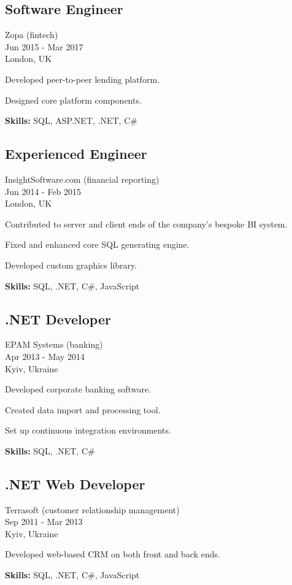 \documentclass[a4paper,10pt]{article}
\begin{document}
\subsection*{Software Engineer}
Zopa (fintech) \\
Jun 2015 - Mar 2017 \\
London, UK
\begin{bulletlist}
    \item Developed peer-to-peer lending platform.
    \item Designed core platform components.
\end{bulletlist}
\textbf{Skills:} SQL, ASP.NET, .NET, C\#

\subsection*{Experienced Engineer}
InsightSoftware.com (financial reporting) \\
Jun 2014 - Feb 2015 \\
London, UK
\begin{bulletlist}
    \item Contributed to server and client ends of the company's bespoke BI system.
    \item Fixed and enhanced core SQL generating engine.
    \item Developed custom graphics library.
\end{bulletlist}
\textbf{Skills:} SQL, .NET, C\#, JavaScript

\subsection*{.NET Developer}
EPAM Systems (banking) \\
Apr 2013 - May 2014 \\
Kyiv, Ukraine
\begin{bulletlist}
    \item Developed corporate banking software.
    \item Created data import and processing tool.
    \item Set up continuous integration environments.
\end{bulletlist}
\textbf{Skills:} SQL, .NET, C\#

\subsection*{.NET Web Developer}
Terrasoft (customer relationship management) \\
Sep 2011 - Mar 2013 \\
Kyiv, Ukraine
\begin{bulletlist}
    \item Developed web-based CRM on both front and back ends.
\end{bulletlist}
\textbf{Skills:} SQL, .NET, C\#, JavaScript
\end{document}
